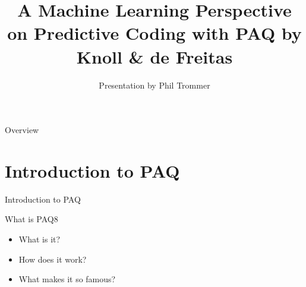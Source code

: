\documentclass[11pt,usenames,dvipsnames]{beamer}
\author{Presentation by Phil Trommer}
\title{A Machine Learning Perspective on Predictive Coding with PAQ by Knoll \& de Freitas}
\begin{document}
\begin{frame}
\titlepage
\end{frame}


\begin{frame}{Overview}
\tableofcontents
\end{frame}


\section{Introduction to PAQ}


\begin{frame}{Introduction to PAQ}
	\begin{block}{What is PAQ8}
			\begin{itemize}
				\item What is it?
				\item How does it work?
				\item What makes it so famous?
			\end{itemize}
	\end{block}
\end{frame}
\end{document}
